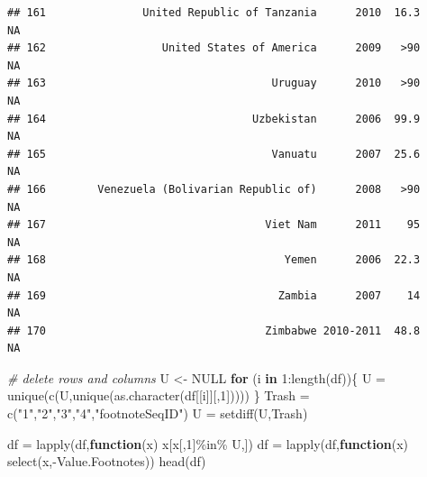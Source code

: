 \documentclass[
]{book}
\newenvironment{Shaded}{\begin{snugshade}}{\end{snugshade}}
\newcommand{\CommentTok}[1]{\textcolor[rgb]{0.56,0.35,0.01}{\textit{#1}}}
\newcommand{\ConstantTok}[1]{\textcolor[rgb]{0.00,0.00,0.00}{#1}}
\newcommand{\ControlFlowTok}[1]{\textcolor[rgb]{0.13,0.29,0.53}{\textbf{#1}}}
\newcommand{\DecValTok}[1]{\textcolor[rgb]{0.00,0.00,0.81}{#1}}
\newcommand{\FunctionTok}[1]{\textcolor[rgb]{0.00,0.00,0.00}{#1}}
\newcommand{\NormalTok}[1]{#1}
\newcommand{\OtherTok}[1]{\textcolor[rgb]{0.56,0.35,0.01}{#1}}
\newcommand{\SpecialCharTok}[1]{\textcolor[rgb]{0.00,0.00,0.00}{#1}}
\newcommand{\StringTok}[1]{\textcolor[rgb]{0.31,0.60,0.02}{#1}}
\begin{document}
\begin{verbatim}
## 161               United Republic of Tanzania      2010  16.3              NA
## 162                  United States of America      2009   >90              NA
## 163                                   Uruguay      2010   >90              NA
## 164                                Uzbekistan      2006  99.9              NA
## 165                                   Vanuatu      2007  25.6              NA
## 166        Venezuela (Bolivarian Republic of)      2008   >90              NA
## 167                                  Viet Nam      2011    95              NA
## 168                                     Yemen      2006  22.3              NA
## 169                                    Zambia      2007    14              NA
## 170                                  Zimbabwe 2010-2011  48.8              NA
\end{verbatim}

\begin{Shaded}
\begin{Highlighting}[]
\CommentTok{\# delete rows and columns}
\NormalTok{U }\OtherTok{\textless{}{-}} \ConstantTok{NULL}
\ControlFlowTok{for}\NormalTok{ (i }\ControlFlowTok{in} \DecValTok{1}\SpecialCharTok{:}\FunctionTok{length}\NormalTok{(df))\{}
\NormalTok{  U }\OtherTok{=} \FunctionTok{unique}\NormalTok{(}\FunctionTok{c}\NormalTok{(U,}\FunctionTok{unique}\NormalTok{(}\FunctionTok{as.character}\NormalTok{(df[[i]][,}\DecValTok{1}\NormalTok{]))))}
\NormalTok{\}}
\NormalTok{Trash }\OtherTok{=} \FunctionTok{c}\NormalTok{(}\StringTok{"1"}\NormalTok{,}\StringTok{"2"}\NormalTok{,}\StringTok{"3"}\NormalTok{,}\StringTok{"4"}\NormalTok{,}\StringTok{"footnoteSeqID"}\NormalTok{)}
\NormalTok{U }\OtherTok{=} \FunctionTok{setdiff}\NormalTok{(U,Trash)}

\NormalTok{df }\OtherTok{=} \FunctionTok{lapply}\NormalTok{(df,}\ControlFlowTok{function}\NormalTok{(x) x[x[,}\DecValTok{1}\NormalTok{]}\SpecialCharTok{\%in\%}\NormalTok{ U,])}
\NormalTok{df }\OtherTok{=} \FunctionTok{lapply}\NormalTok{(df,}\ControlFlowTok{function}\NormalTok{(x) }\FunctionTok{select}\NormalTok{(x,}\SpecialCharTok{{-}}\NormalTok{Value.Footnotes))}
\FunctionTok{head}\NormalTok{(df)}
\end{Highlighting}
\end{Shaded}
\end{document}
